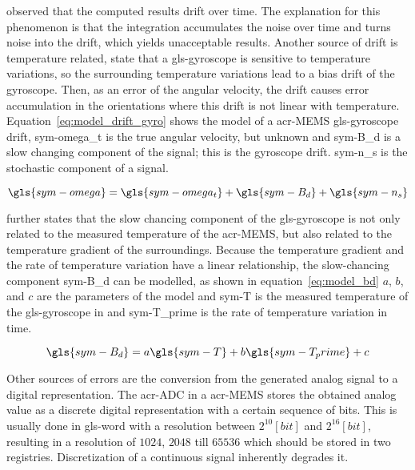 \citet{abyarjoo_implementing_2015} observed that the computed results drift over time. The explanation for this 
phenomenon is that the integration accumulates the noise over time and turns noise into the drift, which yields 
unacceptable results. Another source of drift is temperature related, \citet{feng_adaptive_2015} state that a 
\gls{gls-gyroscope} is sensitive to temperature variations, so the surrounding temperature variations lead to a bias 
drift of the gyroscope. Then, as an error of the angular velocity, the drift causes error accumulation in the 
orientations where this drift is not linear with temperature. Equation~\ref{eq:model_drift_gyro} shows the model of a
\gls{acr-MEMS} \gls{gls-gyroscope} drift, \gls{sym-omega_t} is the true angular velocity, but unknown and 
\gls{sym-B_d} is a slow changing component of the signal; this is the gyroscope drift. \gls{sym-n_s} is the 
stochastic component of a signal.

\begin{equation}
    \label{eq:model_drift_gyro}
    \gls{sym-omega} = \gls{sym-omega_t} + \gls{sym-B_d} + \gls{sym-n_s}
\end{equation}

\citet{abyarjoo_implementing_2015} further states that the slow chancing component of the \gls{gls-gyroscope} is not 
only related to the measured temperature of the \gls{acr-MEMS}, but also related to the temperature gradient of the 
surroundings. Because the temperature gradient and the rate of temperature variation have a linear relationship, the 
slow-chancing component \gls{sym-B_d} can be modelled, as shown in equation~\ref{eq:model_bd} \( a \), \( b \), and 
\( c \) are the parameters of the model \cite{wei_improved_2006} and \gls{sym-T} is the measured temperature of the 
\gls{gls-gyroscope} in  and \gls{sym-T_prime} is the rate of temperature variation in time.

\begin{equation}
    \label{eq:model_bd}
    \gls{sym-B_d} = a\gls{sym-T} + b\gls{sym-T_prime} + c
\end{equation}

Other sources of errors are the conversion from the generated analog signal to a digital representation. The
\gls{acr-ADC} in a \gls{acr-MEMS} stores the obtained analog value as a discrete digital representation with a certain
sequence of bits. This is usually done in \gls{gls-word} with a resolution between \( 2^{10} [bit] \) and \( 2^{16}
[bit] \), resulting in a resolution of \( 1024 \), \( 2048 \) till \( 65536 \) which should be stored in two
registries. Discretization of a continuous signal inherently degrades it.

